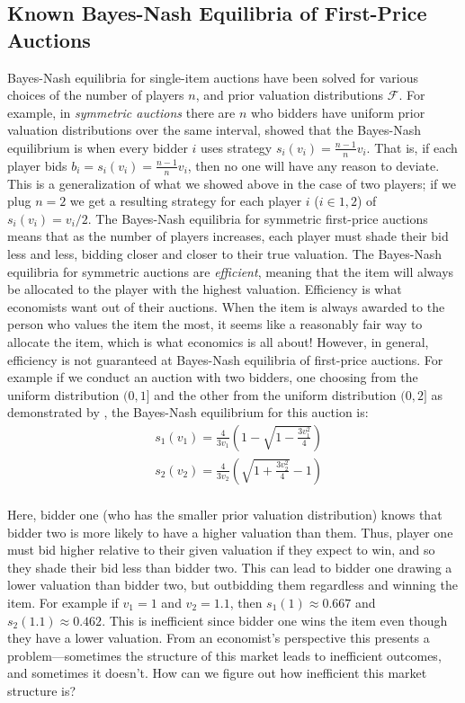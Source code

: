 \documentclass[12pt,twoside]{reedthesis}
\begin{document}
\subsection{Known Bayes-Nash Equilibria of First-Price Auctions}
Bayes-Nash equilibria for single-item auctions have been solved for various choices of the number of players $n$, and prior valuation distributions $\mathcal{F}$. For example, in {\em symmetric auctions} there are $n$ who bidders have uniform prior valuation distributions over the same interval, \cite{Chawla2013} showed that the Bayes-Nash equilibrium is when every bidder $i$ uses strategy $s_i(v_i) = \frac{n-1}{n} v_i$. That is, if each player bids $b_i = s_i(v_i) = \frac{n -1}{n} v_i$, then no one will have any reason to deviate. This is a generalization of what we showed above in the case of two players; if we plug $n=2$ we get a resulting strategy for each player $i$ ($i \in {1,2}$) of $s_i(v_i) = v_i/2$. The Bayes-Nash equilibria for symmetric first-price auctions means that as the number of players increases, each player must shade their bid less and less, bidding closer and closer to their true valuation. The Bayes-Nash equilibria for symmetric auctions are {\em efficient}, meaning that the item will always be allocated to the player with the highest valuation. Efficiency is what economists want out of their auctions. When the item is always awarded to the person who values the item the most, it seems like a reasonably fair way to allocate the item, which is what economics is all about! However, in general, efficiency is not guaranteed at Bayes-Nash equilibria of first-price auctions. For example if we conduct an auction with two bidders, one choosing from the uniform distribution $(0,1]$ and the other from the uniform distribution $(0,2]$ as demonstrated by \citet{Krishna2002}, the Bayes-Nash equilibrium for this auction is:
\begin{align*}
	&s_1(v_1) = \frac{4}{3 v_1} \left(1 - \sqrt{1 - \frac{3v_1^2}{4}}\right)\\
	&s_2(v_2) = \frac{4}{3 v_2} \left(\sqrt{1 + \frac{3v_2^2}{4}} - 1 \right)\\
\end{align*}

Here, bidder one (who has the smaller prior valuation distribution) knows that bidder two is more likely to have a higher valuation than them. Thus, player one must bid higher relative to their given valuation if they expect to win, and so they shade their bid less than bidder two. This can lead to bidder one drawing a lower valuation than bidder two, but outbidding them regardless and winning the item. For example if $v_1 = 1$ and $v_2 = 1.1$, then $s_1(1) \approx 0.667$ and $s_2(1.1) \approx 0.462$. This is inefficient since bidder one wins the item even though they have a lower valuation. From an economist's perspective this presents a problem---sometimes the structure of this market leads to inefficient outcomes, and sometimes it doesn't. How can we figure out how inefficient this market structure is?
\end{document}
